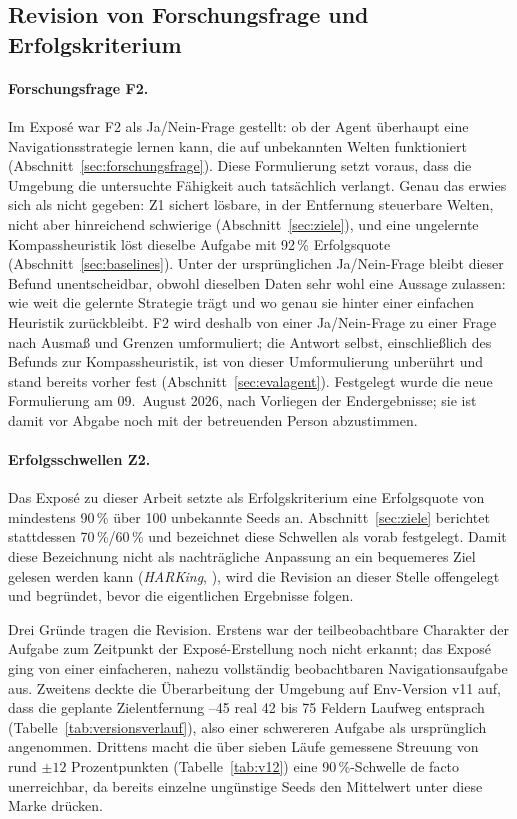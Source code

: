 \documentclass[11pt,a4paper]{article}
\begin{document}
\subsection{Revision von Forschungsfrage und Erfolgskriterium}
\label{sec:kriterienrevision}

\paragraph{Forschungsfrage F2.}
Im Exposé war F2 als Ja/Nein-Frage gestellt: ob der Agent überhaupt eine
Navigationsstrategie lernen kann, die auf unbekannten Welten funktioniert
(Abschnitt~\ref{sec:forschungsfrage}). Diese Formulierung setzt voraus, dass
die Umgebung die untersuchte Fähigkeit auch tatsächlich verlangt. Genau das
erwies sich als nicht gegeben: Z1 sichert lösbare, in der Entfernung
steuerbare Welten, nicht aber hinreichend schwierige
(Abschnitt~\ref{sec:ziele}), und eine ungelernte Kompassheuristik löst
dieselbe Aufgabe mit 92\,\% Erfolgsquote (Abschnitt~\ref{sec:baselines}).
Unter der ursprünglichen Ja/Nein-Frage bleibt dieser Befund unentscheidbar,
obwohl dieselben Daten sehr wohl eine Aussage zulassen: wie weit die
gelernte Strategie trägt und wo genau sie hinter einer einfachen Heuristik
zurückbleibt. F2 wird deshalb von einer Ja/Nein-Frage zu einer Frage nach
Ausmaß und Grenzen umformuliert; die Antwort selbst, einschließlich des
Befunds zur Kompassheuristik, ist von dieser Umformulierung unberührt und
stand bereits vorher fest (Abschnitt~\ref{sec:evalagent}). Festgelegt wurde
die neue Formulierung am 09.\ August 2026, nach Vorliegen der
Endergebnisse; sie ist damit vor Abgabe noch mit der betreuenden Person
abzustimmen.

\paragraph{Erfolgsschwellen Z2.}
Das Exposé zu dieser Arbeit setzte als Erfolgskriterium eine Erfolgsquote von
mindestens 90\,\% über 100 unbekannte Seeds an. Abschnitt~\ref{sec:ziele}
berichtet stattdessen 70\,\%/60\,\% und bezeichnet diese Schwellen als vorab
festgelegt. Damit diese Bezeichnung nicht als nachträgliche Anpassung an ein
bequemeres Ziel gelesen werden kann (\emph{HARKing}, \cite{kerr1998harking}),
wird die Revision an dieser Stelle offengelegt und begründet, bevor die
eigentlichen Ergebnisse folgen.

Drei Gründe tragen die Revision. Erstens war der teilbeobachtbare Charakter
der Aufgabe zum Zeitpunkt der Exposé-Erstellung noch nicht erkannt; das
Exposé ging von einer einfacheren, nahezu vollständig beobachtbaren
Navigationsaufgabe aus. Zweitens deckte die Überarbeitung der Umgebung auf
Env-Version v11 auf, dass die geplante Zielentfernung --45\grqq{}
real 42 bis 75 Feldern Laufweg entsprach (Tabelle~\ref{tab:versionsverlauf}),
also einer schwereren Aufgabe als ursprünglich angenommen. Drittens macht
die über sieben Läufe gemessene Streuung von rund $\pm 12$ Prozentpunkten
(Tabelle~\ref{tab:v12}) eine 90\,\%-Schwelle de facto unerreichbar, da
bereits einzelne ungünstige Seeds den Mittelwert unter diese Marke drücken.
\end{document}

